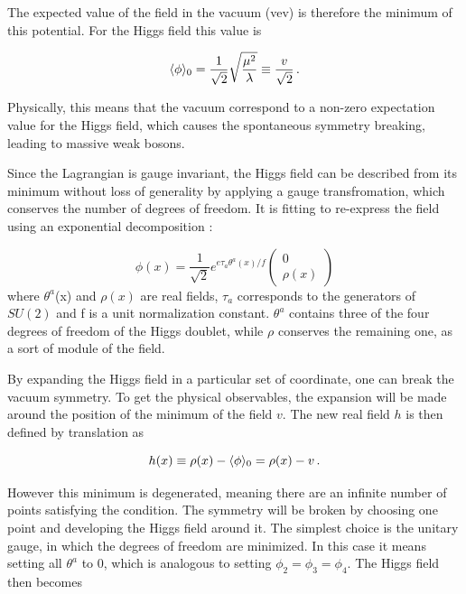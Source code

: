 The expected value of the field in the vacuum (vev) is therefore the minimum of this potential. For the Higgs field this value is

\begin{equation}
    \langle \phi \rangle_0 = \frac{1}{\sqrt{2}}\sqrt{\frac{\mu^2}{\lambda}} \equiv \frac{v}{\sqrt{2}} \mend
\end{equation}

Physically, this means that the vacuum correspond to a non-zero expectation value for the Higgs field, which causes the spontaneous symmetry breaking, leading to massive weak bosons.

Since the Lagrangian is gauge invariant, the Higgs field can be described from its minimum without loss of generality by applying a gauge transfromation, which conserves the number of degrees of freedom. It is fitting to re-express the field using an exponential decomposition :

\begin{equation}
    \phi(x) = \frac{1}{\sqrt{2}}e^{e\tau_a \theta^a (x) / f} \begin{pmatrix} 0 \\ \rho(x) \end{pmatrix}
\end{equation}
where $\theta^a$(x) and $\rho(x)$ are real fields, $\tau_a$ corresponds to the generators of $SU(2)$ and f is a unit normalization constant. $\theta^a$ contains three of the four degrees of freedom of the Higgs doublet, while $\rho$ conserves the remaining one, as a sort of module of the field.\newline

By expanding the Higgs field in a particular set of coordinate, one can break the vacuum symmetry. To get the physical observables, the expansion will be made around the position of the minimum of the field $v$. The new real field $h$ is then defined by translation as

\begin{equation}
    h(x) \equiv \rho (x) - \langle \phi \rangle_0 = \rho(x) - v \mend
\end{equation}

However this minimum is degenerated, meaning there are an infinite number of points satisfying the condition. The symmetry will be broken by choosing one point and developing the Higgs field around it. The simplest choice is the unitary gauge, in which the degrees of freedom are minimized. In this case it means setting all $\theta^a$ to 0, which is analogous to setting $\phi_2 = \phi_3 = \phi_4$. The Higgs field then becomes

